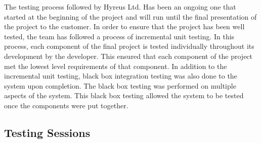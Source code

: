 \documentclass{article}
\begin{document}
\begin{addmargin}[2em]{0em}
\begin{enumerate}
	
The testing process followed by Hyreus Ltd.  Has been an ongoing one that started at the beginning of the project and will run until the final presentation of the project to the customer.  In order to ensure that the project has been well tested, the team has followed a process of incremental unit testing.  In this process, each component of the final project is tested individually throughout its development by the developer.  This ensured that each component of the project met the lowest level requirements of that component.
\newline
\newline 
In addition to the incremental unit testing, black box integration testing was also done to the system upon completion.  The black box testing was performed on multiple aspects of the system.  This black box testing allowed the system to be tested once the components were put together.  

\end{enumerate}
\end{addmargin}


\subsection{Testing Sessions}

\vspace{2.5mm}
\end{document}
